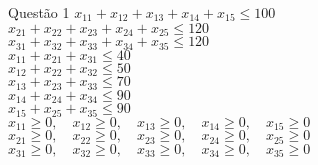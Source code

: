 \documentclass[12pt]{article}
\begin{document}
\begin{section}{Questão 1}
\noindent $x_{11} + x_{12} + x_{13} + x_{14} + x_{15}  \leq 100$\\
$x_{21} + x_{22} + x_{23} +x_{24} + x_{25}  \leq 120$\\
$x_{31} + x_{32} + x_{33} + x_{34} + x_{35} \leq 120$\\
$x_{11} + x_{21} + x_{31} \leq 40$\\
$x_{12} + x_{22} + x_{32} \leq 50$\\
$x_{13} + x_{23} + x_{33} \leq 70$\\
$x_{14} + x_{24} + x_{34} \leq 90$\\
$x_{15} + x_{25} + x_{35} \leq 90$\\
$x_{11} \geq 0, \quad x_{12} \geq 0, \quad x_{13} \geq 0, \quad x_{14} \geq 0, \quad x_{15} \geq 0$\\
$x_{21} \geq 0, \quad x_{22} \geq 0, \quad x_{23} \geq 0, \quad x_{24} \geq 0, \quad x_{25} \geq 0$\\
$x_{31} \geq 0, \quad x_{32} \geq 0, \quad x_{33} \geq 0, \quad x_{34} \geq 0, \quad x_{35} \geq 0$

\end{section}
\newpage
\end{document}
